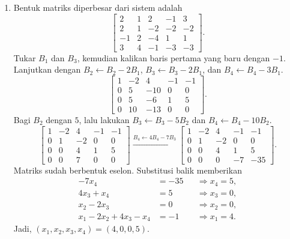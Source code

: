 \documentclass[11pt,a4paper]{article}
\begin{document}
\begin{enumerate}
    \newpage
    \item Bentuk matriks diperbesar dari sistem adalah
    \[
        \left[\begin{array}{rrrr|r}
            2&1&2&-1&3\\
            2&1&-2&-2&-2\\
            -1&2&-4&1&1\\
            3&4&-1&-3&-3
        \end{array}\right].
    \]
    Tukar $B_1$ dan $B_3$, kemudian kalikan baris pertama yang baru dengan $-1$. Lanjutkan dengan $B_2\leftarrow B_2-2B_1$, $B_3\leftarrow B_3-2B_1$, dan $B_4\leftarrow B_4-3B_1$.
    \[
        \left[\begin{array}{rrrr|r}
            1&-2&4&-1&-1\\
            0&5&-10&0&0\\
            0&5&-6&1&5\\
            0&10&-13&0&0
        \end{array}\right].
    \]
    Bagi $B_2$ dengan $5$, lalu lakukan $B_3\leftarrow B_3-5B_2$ dan $B_4\leftarrow B_4-10B_2$.
    \[
        \left[\begin{array}{rrrr|r}
            1&-2&4&-1&-1\\
            0&1&-2&0&0\\
            0&0&4&1&5\\
            0&0&7&0&0
        \end{array}\right]
        \xrightarrow{B_4\leftarrow4B_4-7B_3}
        \left[\begin{array}{rrrr|r}
            1&-2&4&-1&-1\\
            0&1&-2&0&0\\
            0&0&4&1&5\\
            0&0&0&-7&-35
        \end{array}\right].
    \]
    Matriks sudah berbentuk eselon. Substitusi balik memberikan
    \begin{align*}
        -7x_4&=-35 &&\Longrightarrow x_4=5,\\
        4x_3+x_4&=5 &&\Longrightarrow x_3=0,\\
        x_2-2x_3&=0 &&\Longrightarrow x_2=0,\\
        x_1-2x_2+4x_3-x_4&=-1 &&\Longrightarrow x_1=4.
    \end{align*}
    Jadi, $\boxed{(x_1,x_2,x_3,x_4)=(4,0,0,5)}$.
\end{enumerate}
\end{document}
